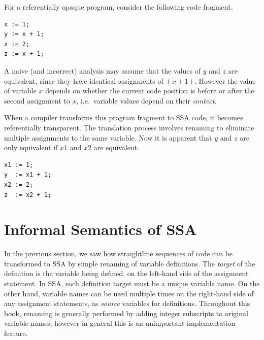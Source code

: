 For a referentially opaque program, consider
the following code fragment.
\begin{verbatim}
x := 1;
y := x + 1;
x := 2;
z := x + 1;
\end{verbatim}
A naive (and incorrect) analysis may assume that the values
of $y$ and $z$ are equivalent, since they have identical 
assignments of $(x+1)$. 
However the value of variable $x$ depends on whether
the current code position is before or after the second assignment
to $x$, i.e.\ variable values depend on their \textit{context}.

When a compiler transforms this program fragment to SSA code,
it becomes referentially transparent. The translation process
involves renaming to  
eliminate multiple assignments to the same variable. Now it is
apparent that $y$ and $z$ are only equivalent if $x1$ and $x2$
are equivalent.
\begin{verbatim}
x1 := 1;
y  := x1 + 1;
x2 := 2;
z  := x2 + 1;
\end{verbatim}







\section{Informal Semantics of SSA}



In the previous section, we saw how straightline sequences of code
can be transformed to SSA by simple renaming of variable definitions.
The \textit{target} of the definition is the variable being defined, on the
left-hand side of the assignment statement.
In SSA, each definition target must be a unique variable name.
On the other hand, variable names can be used multiple times
on the right-hand side of any assignment statements, as 
\textit{source} variables for definitions.
Throughout this book, renaming is generally performed by 
adding integer subscripts to original variable names;
however in general this is an unimportant implementation feature.

